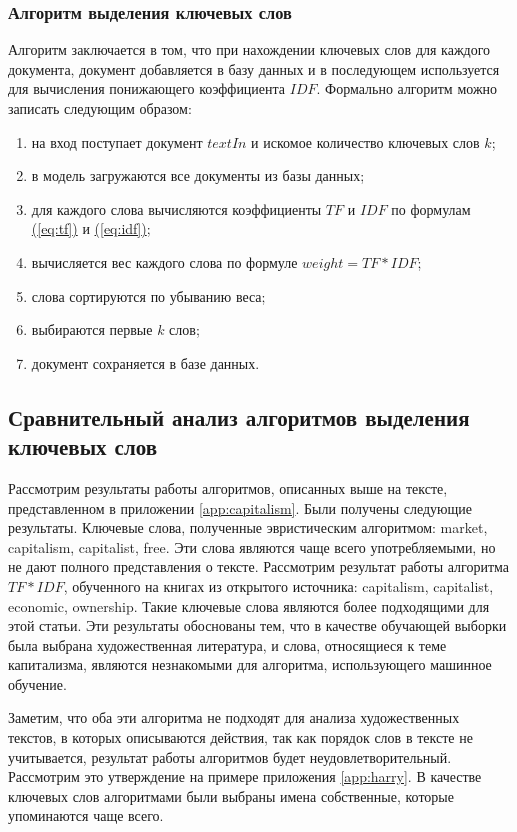 \subsubsection{Алгоритм выделения ключевых слов}

Алгоритм заключается в том, что при нахождении ключевых слов для каждого документа, документ добавляется в базу данных и в последующем используется для вычисления понижающего коэффициента $IDF$. Формально алгоритм можно записать следующим образом:
\begin{enumerate}
\item на вход поступает документ $textIn$ и искомое количество ключевых слов $k$;
\item в модель загружаются все документы из базы данных;
\item для каждого слова вычисляются коэффициенты $TF$ и $IDF$ по формулам \hyperref[eq:tf]{(\ref{eq:tf})} и \hyperref[eq:idf]{(\ref{eq:idf})};
\item вычисляется вес каждого слова по формуле $weight = TF*IDF$;
\item слова сортируются по убыванию веса;
\item выбираются первые $k$ слов;
\item документ сохраняется в базе данных.
\end{enumerate}

\subsection{Сравнительный анализ алгоритмов выделения ключевых слов}

Рассмотрим результаты работы алгоритмов, описанных выше на тексте, представленном в приложении \hyperref[app:capitalism]{\ref{app:capitalism}}. Были получены следующие результаты. Ключевые слова, полученные эвристическим алгоритмом: market, capitalism, capitalist, free. Эти слова являются чаще всего употребляемыми, но не дают полного представления о тексте. Рассмотрим результат работы алгоритма $TF*IDF$, обученного на книгах из открытого источника: capitalism, capitalist, economic, ownership. Такие ключевые слова являются более подходящими для этой статьи. Эти результаты обоснованы тем, что в качестве обучающей выборки была выбрана художественная литература, и слова, относящиеся к теме капитализма, являются незнакомыми для алгоритма, использующего машинное обучение.

Заметим, что оба эти алгоритма не подходят для анализа художественных текстов, в которых описываются действия, так как порядок слов в тексте не учитывается, результат работы алгоритмов будет неудовлетворительный. Рассмотрим это утверждение на примере приложения \hyperref[app:harry]{\ref{app:harry}}. В качестве ключевых слов алгоритмами были выбраны имена собственные, которые упоминаются чаще всего.

